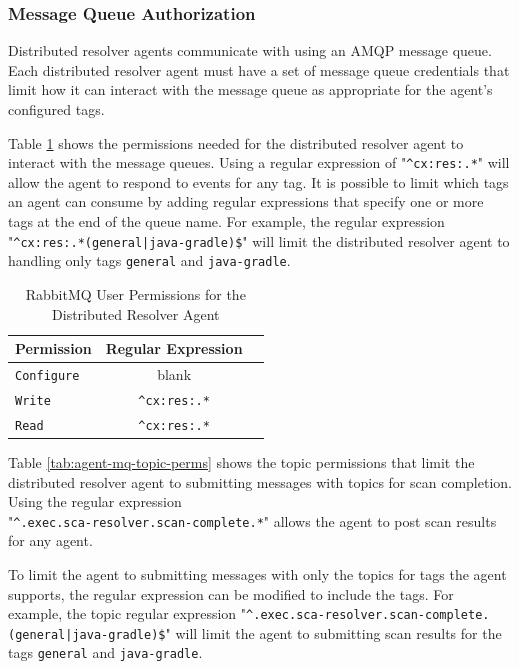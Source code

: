 \subsubsection{Message Queue Authorization}\label{sec:agent-mq-auth-req}

Distributed resolver agents communicate with \cxoneflow using an AMQP message queue. Each distributed
resolver agent must have a set of message queue credentials that limit how it can interact
with the message queue as appropriate for the agent's configured tags.

Table \ref{tab:agent-mq-user-perms} shows the permissions needed for the distributed resolver agent
to interact with the message queues.  Using a regular expression of "\texttt{\^{}cx:res:.*}" will allow
the agent to respond to events for any tag.  It is possible to limit which tags an agent can consume
by adding regular expressions that specify one or more tags at the end of the queue name.  For example, the
regular expression "\texttt{\^{}cx:res:.*(general|java-gradle)\$}" will limit the distributed resolver agent
to handling only tags \texttt{general} and \texttt{java-gradle}.

\begin{table}[ht]
  \caption{RabbitMQ User Permissions for the Distributed Resolver Agent}  
  \label{tab:agent-mq-user-perms}      
  \begin{tabularx}{\textwidth}{lcl}
      \toprule
      \textbf{Permission} & \textbf{Regular Expression} \\
      \midrule
      \texttt{Configure} & blank \\
      \midrule
      \texttt{Write} & \texttt{\^{}cx:res:.*} \\
      \midrule
      \texttt{Read} & \texttt{\^{}cx:res:.*} \\
      \midrule
      \bottomrule
  \end{tabularx}
\end{table}

Table \ref{tab:agent-mq-topic-perms} shows the topic permissions that limit the distributed resolver agent
to submitting messages with topics for scan completion.  Using the regular expression\\"\texttt{\^{}.exec.sca-resolver.scan-complete.*}"
allows the agent to post scan results for any agent.

To limit the agent to submitting messages with only the topics for tags the agent supports, the regular expression can
be modified to include the tags.  For example, the topic regular expression
"\texttt{\^{}.exec.sca-resolver.scan-complete.(general|java-gradle)\$}" will limit the agent to submitting
scan results for the tags \texttt{general} and \texttt{java-gradle}.

